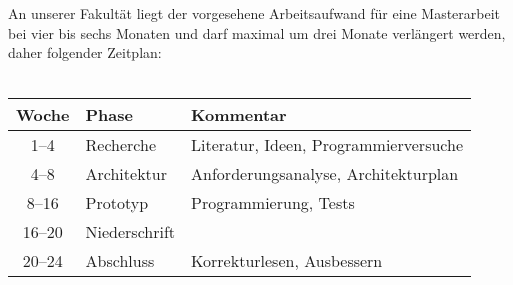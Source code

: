 An unserer Fakultät liegt der vorgesehene Arbeitsaufwand für eine Masterarbeit
bei vier bis sechs Monaten und darf maximal um drei Monate verlängert werden,
daher folgender Zeitplan:
\\\\
\begin{tabular}{ | c || l | l | }
  \hline
  Woche & Phase & Kommentar \\\hline
  1--4 & Recherche & Literatur, Ideen, Programmierversuche \\
  4--8 & Architektur & Anforderungsanalyse, Architekturplan \\
  8--16 & Prototyp & Programmierung, Tests \\
  16--20 & Niederschrift &  \\
  20--24 & Abschluss & Korrekturlesen, Ausbessern \\
  \hline
\end{tabular}

